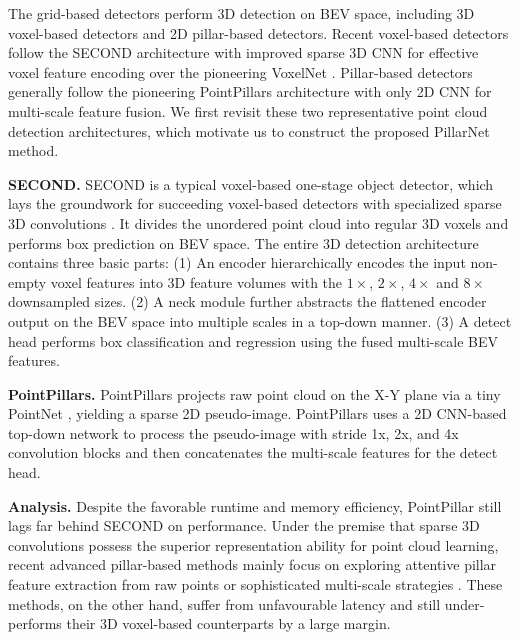 \documentclass[runningheads]{llncs}
\begin{document}
The grid-based detectors perform 3D detection on BEV space, including 3D voxel-based detectors and 2D pillar-based detectors.
Recent voxel-based detectors follow the SECOND \cite{yan2018second} architecture with improved sparse 3D CNN for effective voxel feature encoding over the pioneering VoxelNet \cite{zhou2018voxelnet}.
Pillar-based detectors generally follow the pioneering PointPillars \cite{lang2019pointpillars} architecture with only 2D CNN for multi-scale feature fusion.
We first revisit these two representative point cloud detection architectures, which motivate us to construct the proposed PillarNet method.

{\flushleft \bf SECOND.} SECOND \cite{yan2018second} is a typical voxel-based one-stage object detector, which lays the groundwork for succeeding voxel-based detectors with specialized sparse 3D convolutions \cite{graham20183d,graham2017submanifold}.
It divides the unordered point cloud into regular 3D voxels and performs box prediction on BEV space.
The entire 3D detection architecture contains three basic parts: 
(1) An encoder hierarchically encodes the input non-empty voxel features into 3D feature volumes with the $1\times$, $2\times$, $4\times$ and $8\times$ downsampled sizes.
(2) A neck module further abstracts the flattened encoder output on the BEV space into multiple scales in a top-down manner.
(3) A detect head performs box classification and regression using the fused multi-scale BEV features.

{\flushleft \bf PointPillars.}
PointPillars \cite{lang2019pointpillars} projects raw point cloud on the X-Y plane via a tiny PointNet \cite{qi2017pointnet}, yielding a sparse 2D pseudo-image. 
PointPillars uses a 2D CNN-based top-down network to process the pseudo-image with stride 1x, 2x, and 4x convolution blocks and then  concatenates the multi-scale features for the detect head.

{\flushleft \bf Analysis.}
Despite the favorable runtime and memory efficiency, PointPillar  \cite{lang2019pointpillars} still lags far behind SECOND \cite{yan2018second} on performance.
Under the premise that sparse 3D convolutions possess the superior representation ability for point cloud learning, recent advanced pillar-based methods mainly focus on exploring attentive pillar feature extraction \cite{liu2020tanet,ye2020hvnet} from raw points or sophisticated multi-scale strategies \cite{wang2019voxel,ye2020hvnet,noh2021hvpr}. These methods, on the other hand, suffer from unfavourable latency and still under-performs their 3D voxel-based counterparts by a large margin.
\end{document}
